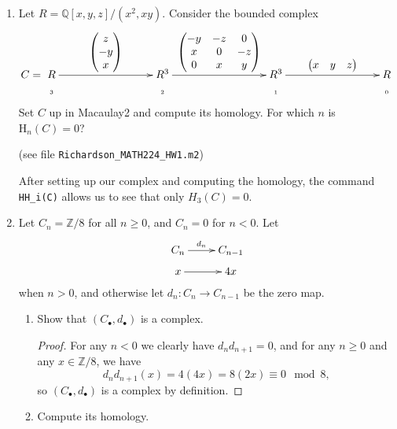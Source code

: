 \documentclass[11pt,oneside,english]{amsart}
\theoremstyle{definition}
\newcommand{\lspace}{\vspace{5mm}}
\newcommand{\MB}[1]{\mathbb{#1}}
\begin{document}
\rightline{\today}

\lspace




\begin{enumerate}[leftmargin=*]
\itemsep5mm

\item Let $R = \mathbb{Q}[x,y,z]/(x^2,xy)$. Consider the bounded complex
\[
C = \xymatrix@R=1mm@C=30mm{R \ar[r]^-{\begin{pmatrix} z \\ -y \\ x \end{pmatrix}} & R^3 \ar[r]^-{\begin{pmatrix} -y & -z & 0 \\ x & 0 & -z \\ 0 & x & y \end{pmatrix}
} & R^3 \ar[r]^-{\begin{pmatrix} x & y & z\end{pmatrix}
} & R \\ \text{{\tiny 3}} & \text{{\tiny 2}} & \text{{\tiny 1}} & \text{{\tiny 0}}}
\]
Set $C$ up in Macaulay2 and compute its homology. For which $n$ is $\text{H}_n(C) = 0$?

(see file \verb!Richardson_MATH224_HW1.m2!)

After setting up our complex and computing the homology, the command \verb!HH_i(C)! allows us to see that only $H_3(C)=0$.

\pagebreak

\item Let $C_n = \mathbb{Z}/8$ for all $n \geqslant 0$, and $C_n = 0$ for $n<0$. Let 
\[
\xymatrix@R=2mm{C_n \ar[r]^-{d_n} & C_{n-1} \\ x \ar[r] & 4x}
\]
when $n>0$, and otherwise let $d_n\!: C_n \longrightarrow C_{n-1}$ be the zero map.
\begin{enumerate}
\itemsep5mm
\item Show that $(C_\bullet,d_\bullet)$ is a complex.

\begin{proof}
For any $n<0$ we clearly have $d_nd_{n+1}=0$, and for any $n\geq 0$ and any $x\in\MB{Z}/8$, we have
\[
d_nd_{n+1}(x)=4(4x)=8(2x)\equiv 0\mod 8,
\]
so $(C_\bullet,d_\bullet)$ is a complex by definition.
\end{proof}

\item Compute its homology.


\end{enumerate}
\end{enumerate}
\end{document}
